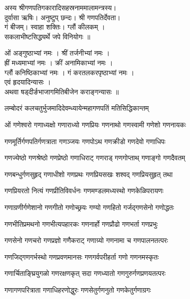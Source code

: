 

अस्य श्रीगणपतिगकारादिसहस्रनाममालामन्त्रस्य।\\
दुर्वासा ऋषिः। अनुष्टुप् छन्दः। श्री गणपतिर्देवता।\\
गं बीजम्। स्वाहा शक्तिः। ग्लौं कीलकम् ।\\
 सकलाभीष्टसिद्ध्यर्थे जपे विनियोगः ॥

ओं अङ्गुष्ठाभ्यां नमः । श्रीं तर्जनीभ्यां नमः ।\\
ह्रीं मध्यमाभ्यां नमः । क्रीं अनामिकाभ्यां नमः ।\\
 ग्लौं कनिष्ठिकाभ्यां नमः । गं करतलकरपृष्ठाभ्यां नमः ।\\
 एवं हृदयादिन्यासः । \\
अथवा षड्दीर्ङभाजागमितिबीजेन कराङ्गन्यासः ॥

{लम्बोदरं कलचतुर्भुजमादिदेवम्}{ध्यायेन्महागणपतिं मतिसिद्धिकान्तम्}


\twolineshloka
{ओं गणेश्वरो गणाध्यक्षो गणाराध्यो गणप्रियः}
{गणनाथो गणस्वामी गणेशो गणनायकः}%

\twolineshloka
{गणमूर्तिर्गणपतिर्गणत्राता गणञ्जयः}%
{गणपोऽथ गणक्रीडो गणदेवो गणाधिपः}%

\twolineshloka
{गणज्येष्ठो गणश्रेष्ठो गणप्रेष्ठो गणाधिराट्}%
{गणराड् गणगोप्ताथ् गणाङ्गो गणदैवतम्}%

\twolineshloka
{गणबन्धुर्गणसुहृद् गणाधीशो गणप्रथः}%
{गणप्रियसखः शश्वद् गणप्रियसुहृत् तथा}%

\twolineshloka
{गणप्रियरतो नित्यं गणप्रीतिविवर्धनः}%
{गणमण्डलमध्यस्थो गणकेळिपरायणः}%

\twolineshloka
{गणाग्रणीर्गणेशानो गणगीतो गणोच्छ्रयः}%
{गण्यो गणहितो गर्जद्गणसेनो गणोद्धतः}%

\twolineshloka
{गणभीतिप्रमथनो गणभीत्यपहारकः}%
{गणनार्हो गणप्रौढो गणभर्ता गणप्रभुः}%

\twolineshloka
{गणसेनो गणचरो गणप्रज्ञो गणैकराट्}%
{गणाग्र्यो गणनामा च गणपालनतत्परः}%

\twolineshloka
{गणजिद्गणगर्भस्थो गणप्रवणमानसः}%
{गणगर्वपरीहर्ता गणो गणनमस्कृतः}%

\twolineshloka
{गणार्चिताङ्घ्रियुगळो गणरक्षणकृत् सदा}%
{गणध्यातो गणगुरुर्गणप्रणयतत्परः}%

\twolineshloka
{गणागणपरित्राता गणाधिहरणोद्धुरः}%
{गणसेतुर्गणनुतो गणकेतुर्गणाग्रगः}%


